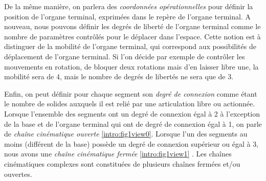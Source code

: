 De la m\^eme mani\`ere, on parlera des {\it coordonn\'ees op\'erationnelles} pour d\'efinir la position de l'organe terminal, exprim\'ees dans le rep\`ere de l'organe terminal. A nouveau, nous pouvons d\'efinir les degr\'es de libert\'e de l'organe terminal comme le nombre de param\`etres contr\^ol\'es pour le d\'eplacer dans l'espace. Cette notion est \`a distinguer de la mobilit\'e de l'organe terminal, qui correspond aux possibilit\'es de d\'eplacement de l'organe terminal. Si l'on d\'ecide par exemple de contr\^oler les mouvements en rotation, de bloquer deux rotations mais d'en laisser libre une, la mobilit\'e sera de 4, mais le nombre de degr\'es de libert\'es ne sera que de 3.

Enfin, on peut d\'efinir pour chaque segment son {\it degr\'e de connexion} comme \'etant le nombre de solides auxquels il est reli\'e par une articulation libre ou actionn\'ee. Lorsque l'ensemble des segments ont un degr\'e de connexion \'egal \`a 2 \`a l'exception de la base et de l'organe terminal qui ont de degr\'e de connexion \'egal \`a 1, on parle de {\it cha\^ine cin\'ematique ouverte} \ref{intro:fig1view0}. Lorsque l'un des segments au moins (différent de la base) poss\`ede un degr\'e de connexion sup\'erieur ou \'egal \`a 3, nous avons une {\it cha\^ine cin\'ematique ferm\'ee} \ref{intro:fig1view1} \cite{journals/gosselin1989}. Les cha\^ines cin\'ematiques complexes sont constitu\'ees de plusieurs cha\^ines ferm\'ees et/ou ouvertes.

